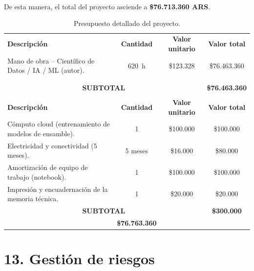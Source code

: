 \documentclass[
11pt, %
]{charter}
\begin{document}
De esta manera, el total del proyecto asciende a \textbf{\$76.713.360 ARS}.

\vspace{0.3cm}

\begin{table}[htpb]
\centering
\setlength{\tabcolsep}{6pt}
\renewcommand{\arraystretch}{1.2}
\begin{tabularx}{\linewidth}{@{}|X|c|c|c|@{}}
\hline
\rowcolor[HTML]{C0C0C0}
\multicolumn{4}{|c|}{\textbf{COSTOS DIRECTOS}} \\ \hline
\rowcolor[HTML]{C0C0C0}
\textbf{Descripción} & \textbf{Cantidad} & \textbf{Valor unitario} & \textbf{Valor total} \\ \hline
Mano de obra -- Científico de Datos / IA / ML (autor). & 620~h & \$123.328 & \$76.463.360 \\ \hline
 &  &  &  \\ \hline
 &  &  &  \\ \hline
\multicolumn{3}{|c|}{\textbf{SUBTOTAL}} & \textbf{\$76.463.360} \\ \hline
\rowcolor[HTML]{C0C0C0}
\multicolumn{4}{|c|}{\textbf{COSTOS INDIRECTOS}} \\ \hline
\rowcolor[HTML]{C0C0C0}
\textbf{Descripción} & \textbf{Cantidad} & \textbf{Valor unitario} & \textbf{Valor total} \\ \hline
Cómputo cloud (entrenamiento de modelos de ensamble). & 1 & \$100.000 & \$100.000 \\ \hline
Electricidad y conectividad (5 meses). & 5 meses & \$16.000 & \$80.000 \\ \hline
Amortización de equipo de trabajo (notebook). & 1 & \$100.000 & \$100.000 \\ \hline
Impresión y encuadernación de la memoria técnica. & 1 & \$20.000 & \$20.000 \\ \hline
\multicolumn{3}{|c|}{\textbf{SUBTOTAL}} & \textbf{\$300.000} \\ \hline
\rowcolor[HTML]{C0C0C0}
\multicolumn{3}{|c|}{\textbf{TOTAL}} & \textbf{\$76.763.360} \\ \hline
\end{tabularx}
\caption{Presupuesto detallado del proyecto.}
\label{tab:presupuesto}
\end{table}




\section{13. Gestión de riesgos}
\label{sec:riesgos}
\end{document}
